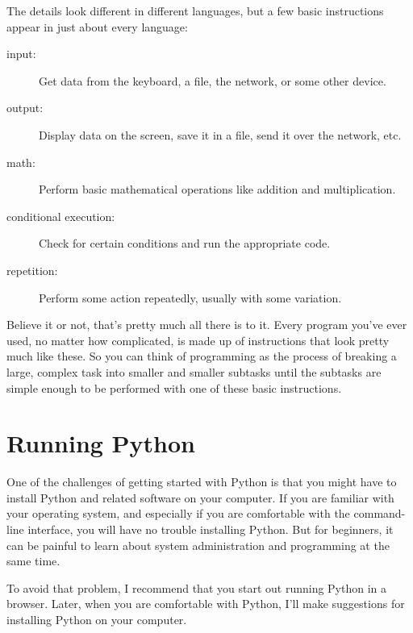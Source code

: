 \documentclass[10pt]{book}
\begin{document}
The details look different in different languages, but a few basic
instructions appear in just about every language:

\begin{description}

\item[input:] Get data from the keyboard, a file, the network, or some
other device.

\item[output:] Display data on the screen, save it in a
file, send it over the network, etc.

\item[math:] Perform basic mathematical operations like addition and
multiplication.

\item[conditional execution:] Check for certain conditions and
run the appropriate code.

\item[repetition:] Perform some action repeatedly, usually with
some variation.

\end{description}

Believe it or not, that's pretty much all there is to it.  Every
program you've ever used, no matter how complicated, is made up of
instructions that look pretty much like these.  So you can think of
programming as the process of breaking a large, complex task
into smaller and smaller subtasks until the subtasks are
simple enough to be performed with one of these basic instructions.


\section{Running Python}

One of the challenges of getting started with Python is that you
might have to install Python and related software on your computer.
If you are familiar with your operating system, and especially
if you are comfortable with the command-line interface, you will
have no trouble installing Python.  But for beginners, it can be
painful to learn about system administration and programming at the
same time.

To avoid that problem, I recommend that you start out running Python
in a browser.  Later, when you are comfortable with Python, I'll
make suggestions for installing Python on your computer.
\end{document}
